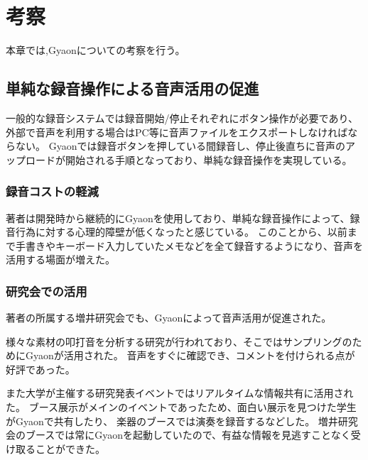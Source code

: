 \chapter{考察}
\label{chap:discussion}

本章では,Gyaonについての考察を行う。

\newpage

\section{単純な録音操作による音声活用の促進}
一般的な録音システムでは録音開始/停止それぞれにボタン操作が必要であり、
外部で音声を利用する場合はPC等に音声ファイルをエクスポートしなければならない。
Gyaonでは録音ボタンを押している間録音し、停止後直ちに音声のアップロードが開始される手順となっており、単純な録音操作を実現している。

\subsection{録音コストの軽減}

著者は開発時から継続的にGyaonを使用しており、単純な録音操作によって、録音行為に対する心理的障壁が低くなったと感じている。
このことから、以前まで手書きやキーボード入力していたメモなどを全て録音するようになり、音声を活用する場面が増えた。

\subsection{研究会での活用}
著者の所属する増井研究会でも、Gyaonによって音声活用が促進された。

様々な素材の叩打音を分析する研究が行われており、そこではサンプリングのためにGyaonが活用された。
音声をすぐに確認でき、コメントを付けられる点が好評であった。

また大学が主催する研究発表イベントではリアルタイムな情報共有に活用された。
ブース展示がメインのイベントであったため、面白い展示を見つけた学生がGyaonで共有したり、
楽器のブースでは演奏を録音するなどした。
増井研究会のブースでは常にGyaonを起動していたので、有益な情報を見逃すことなく受け取ることができた。

%


